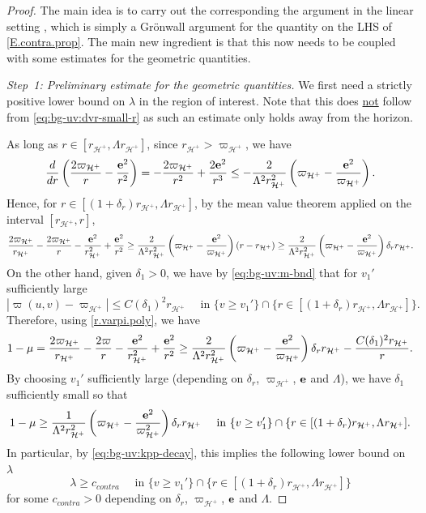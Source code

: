 \documentclass[10pt, reqno]{amsart}
\theoremstyle{definition}
\theoremstyle{remark}
\theoremstyle{conjecture}
\numberwithin{equation}{section}
\newcommand{\0}{\emptyset}
\newcommand{\bfe}{{\bf e}}
\newcommand{\calH}{\mathcal H}
\newcommand{\f}{\frac}
\newcommand{\de}{\delta}
\newcommand{\EH}{\calH^{+}}
\newcommand{\pfstep}[1]{\vspace{.5em} {\it \noindent #1.}}
\newcommand{\e}{\bfe}							%
\begin{document}
\begin{proof}
The main idea is to carry out the corresponding the argument in the linear setting \cite{LO.instab}, which is simply a Gr\"onwall argument for the quantity on the LHS of \eqref{E.contra.prop}. The main new ingredient is that this now needs to be coupled with some estimates for the geometric quantities.

\pfstep{Step~1: Preliminary estimate for the geometric quantities} We first need a strictly positive lower bound on $\lambda$ in the region of interest. Note that this does \underline{not} follow from \eqref{eq:bg-uv:dvr-small-r} as such an estimate only holds away from the horizon. 

As long as $r\in [r_{\EH}, \Lambda r_{\EH}]$, since $r_{\EH}>\varpi_{\EH}$, we have
$$\f{d}{dr} \left(\f{2\varpi_{\EH}}{r}-\f{\e^2}{r^2}\right)=-\f{2\varpi_{\EH}}{r^2}+\f{2\e^2}{r^3}\leq -\f{2}{\Lambda^2 r_{\EH}^2}\left(\varpi_{\EH}-\f{\e^2}{\varpi_{\EH}}\right).$$
Hence, for $r\in [(1+{\de_r}) r_{\EH},\Lambda r_{\EH}]$, by the mean value theorem applied on the interval $[r_{\EH}, r]$,
$$\f{2\varpi_{\EH}}{r_{\EH}}-\f{2\varpi_{\EH}}{r}-\f{\e^2}{r^2_{\EH}}+\f{\e^2}{r^2}\geq \f{2}{\Lambda^2 r_{\EH}^2}\left(\varpi_{\EH}-\f{\e^2}{\varpi_{\EH}}\right) (r-r_{\EH})\geq \f{2}{\Lambda^2 r_{\EH}^2}\left(\varpi_{\EH}-\f{\e^2}{\varpi_{\EH}}\right) {\de_r} r_{\EH}.$$
On the other hand, given $\de_1>0$, we have by \eqref{eq:bg-uv:m-bnd} that for $v_1'$ sufficiently large
$$\left|\varpi(u,v)-\varpi_{\EH}\right|\leq C(\de_1)^2 r_{\EH}\quad\mbox{ in }\{v\geq v_1'\}\cap\{r\in [(1+{\de_r})r_{\EH},\Lambda r_{\EH}]\}.$$
Therefore, using \eqref{r.varpi.poly}, we have 
$$1-\mu=\f{2\varpi_{\EH}}{r_{\EH}}-\f{2\varpi}{r}-\f{\e^2}{r^2_{\EH}}+\f{\e^2}{r^2}\geq \f{2}{\Lambda^2 r_{\EH}^2}\left(\varpi_{\EH}-\f{\e^2}{\varpi_{\EH}}\right) {\de_r} r_{\EH} -\f{C(\de_1)^2 r_{\EH}}{r}.$$
By choosing $v_1'$ sufficiently large (depending on ${\de_r}$, $\varpi_{\EH}$, $\e$ and $\Lambda$), we have $\de_1$ sufficiently small so that 
$$1-\mu\geq \f{1}{\Lambda^2 r_{\EH}^2}\left(\varpi_{\EH}-\f{\e^2}{\varpi_{\EH}^2}\right) {\de_r} r_{\EH}\quad\mbox{ in }\{v\geq v_1'\}\cap\{r\in [(1+{\de_r})r_{\EH},\Lambda r_{\EH}].$$
In particular, by \eqref{eq:bg-uv:kpp-decay}, this implies the following lower bound on $\lambda$ 
\begin{equation}\label{E.contra.dvr.lower}
\lambda\geq c_{contra}\quad\mbox{ in }\{v\geq v_1'\}\cap\{r\in [(1+{\de_r})r_{\EH},\Lambda r_{\EH}]\}
\end{equation}
for some $c_{contra}>0$ depending on ${\de_r}$, $\varpi_{\EH}$, $\e$ and $\Lambda$. 


\end{proof}
\end{document}
